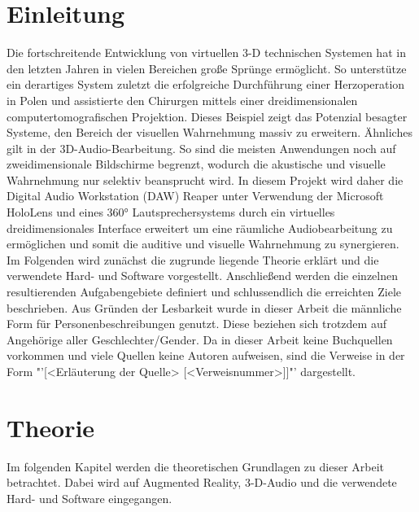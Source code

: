 \documentclass[11pt, titlepage, fleqn]{report}
\begin{document}
    \chapter{Einleitung}%
    \label{sec:Einleitung} 
     	\sloppy \nohyphens{
        Die fortschreitende Entwicklung von virtuellen 3-D technischen Systemen hat in den letzten Jahren in vielen Bereichen große Sprünge ermöglicht. So unterstütze ein 
        derartiges System zuletzt die erfolgreiche Durchführung einer Herzoperation in Polen und assistierte den Chirurgen mittels einer dreidimensionalen computertomografischen 
        Projektion. Dieses Beispiel zeigt das Potenzial besagter Systeme, den Bereich der visuellen Wahrnehmung massiv zu erweitern. 
        \newline Ähnliches gilt in der 3D-Audio-Bearbeitung. 
        So sind die meisten Anwendungen noch auf zweidimensionale Bildschirme begrenzt, wodurch die akustische und visuelle Wahrnehmung nur selektiv beansprucht wird. 
        In diesem Projekt wird daher die Digital Audio Workstation (DAW) Reaper 
        unter Verwendung der Microsoft HoloLens und eines 360° 
        Lautsprechersystems durch ein virtuelles 
        dreidimensionales Interface erweitert um eine räumliche 
        Audiobearbeitung zu ermöglichen und somit die auditive und visuelle 
        Wahrnehmung zu synergieren.\newline
        Im Folgenden wird zunächst die zugrunde liegende Theorie erklärt und die verwendete Hard- und Software vorgestellt. Anschließend werden die einzelnen resultierenden 
        Aufgabengebiete definiert und schlussendlich die erreichten Ziele 
        beschrieben.\vspace{\baselineskip}\newline
        Aus Gründen der Lesbarkeit wurde in dieser Arbeit die männliche Form 
        für Personenbeschreibungen genutzt. Diese beziehen sich trotzdem auf 
        Angehörige aller Geschlechter/Gender. \newline
        Da in dieser Arbeit keine Buchquellen vorkommen und viele Quellen keine 
        Autoren aufweisen, sind die Verweise in der Form "'[<Erläuterung der 
        Quelle> [<Verweisnummer>]]"' dargestellt.\newline
    	}
    \chapter{Theorie}%
    \label{sec:Theorie}
    	Im folgenden Kapitel werden die theoretischen Grundlagen zu dieser 
    	Arbeit betrachtet. Dabei wird auf Augmented Reality, 3-D-Audio und die 
    	verwendete Hard- und Software eingegangen.
\end{document}
